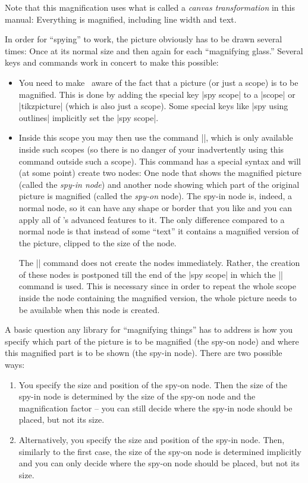 Note that this magnification uses what is called a \emph{canvas
  transformation} in this manual: Everything is magnified, including
line width and text.

In order for ``spying'' to work, the picture obviously has to be drawn
several times: Once at its normal size and then again for each
``magnifying glass.'' Several keys and commands work in concert to
make this possible:
\begin{itemize}
\item You need to make \tikzname\ aware of the fact that a picture (or
  just a scope) is to be magnified. This is done by adding the special
  key |spy scope| to a |{scope}| or |{tikzpicture}| (which is also
  just a scope). Some special keys like |spy using outlines|
  implicitly set the |spy scope|.

\item Inside this scope you may then use the command |\spy|, which is
  only available inside such scopes (so there is no danger of your
  inadvertently using this command outside such a scope). This command
  has a special syntax and will (at some point) create two nodes: One
  node that shows the magnified picture (called the \emph{spy-in
    node}) and another node showing which part of the original picture
  is magnified (called the \emph{spy-on} node). The spy-in node is,
  indeed, a normal node, so it can have any shape or border that you
  like and you can apply all of \tikzname's advanced features to
  it. The only difference compared to a normal node is that instead of
  some ``text'' it contains a magnified version of the picture,
  clipped to the size of the node.

  The |\spy| command does not create the nodes immediately. Rather,
  the creation of these nodes is postponed till the end of the
  |spy scope| in which the |\spy| command is used. This is necessary
  since in order to repeat the whole scope inside the node containing
  the magnified version, the whole picture needs to be available when
  this node is created.
\end{itemize}

A basic question any library for ``magnifying things'' has to address
is how you specify which part of the picture is to be
magnified (the spy-on node) and where this magnified part is to be
shown (the spy-in node). There are two possible ways:
\begin{enumerate}
\item You specify the size and position of the spy-on node. Then the
  size of the spy-in node is determined by the size of the spy-on node
  and the magnification factor -- you can still decide where the
  spy-in node should be placed, but not its size.
\item Alternatively, you specify the size and position of the spy-in
  node. Then, similarly to the first case, the size of the spy-on node
  is determined implicitly and you can only decide where the
  spy-on node should be placed, but not its size.
\end{enumerate}

